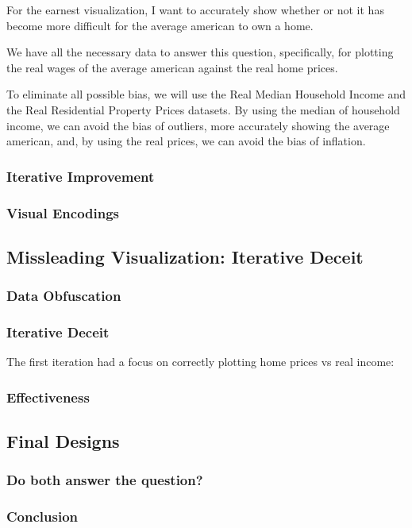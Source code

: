 \documentclass{article}
\begin{document}
For the earnest visualization, I want to accurately show whether or not it has become
more difficult for the average american to own a home. 

We have all the necessary data to answer this question, specifically, for plotting the
real wages of the average american against the real home prices.

To eliminate all possible bias, we will use the Real Median Household Income 
and the Real Residential Property Prices datasets. By using the median of household income,
we can avoid the bias of outliers, more accurately showing the average american, 
and, by using the real prices, we can avoid the bias of inflation. 



\subsubsection{Iterative Improvement}

\subsubsection{Visual Encodings}

\subsection{Missleading Visualization: Iterative Deceit}
\subsubsection{Data Obfuscation}
\subsubsection{Iterative Deceit}
The first iteration had a focus on correctly plotting home prices vs real income:
\subsubsection{Effectiveness}

\subsection{Final Designs}
\subsubsection{Do both answer the question?}
\subsubsection{Conclusion}

\newpage
\begin{refcontext}[sorting=nyt]
\printbibliography
\end{refcontext}
\end{document}
